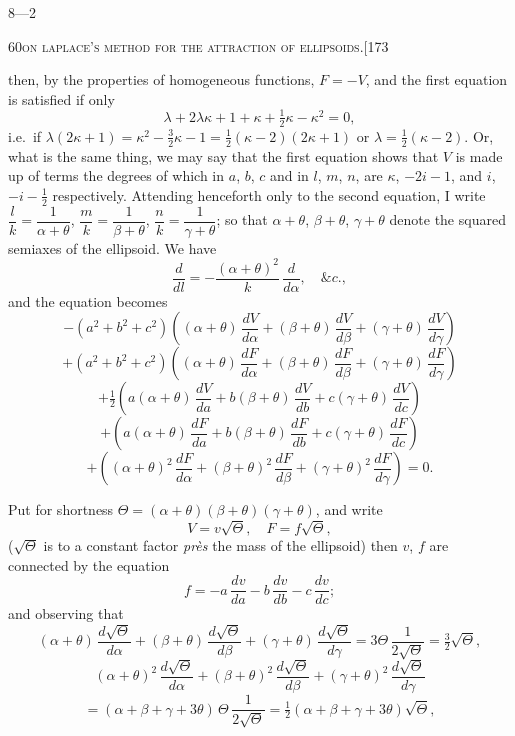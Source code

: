 \documentclass[11pt]{article}
\begin{document}
\medskip
\hfill 8---2

\newpage

\begin{center}
\small\textsc{60}\hfill\textsc{on laplace's method for the attraction of ellipsoids.}\hfill[173
\end{center}

\medskip

\noindent then, by the properties of homogeneous functions, $F = - V$, and the first equation is
satisfied if only
\[
\lambda + 2\lambda\kappa + 1 + \kappa + \tfrac{1}{2}\kappa - \kappa^{2} = 0,
\]
i.e.\ if $\lambda(2\kappa+1) = \kappa^{2} - \tfrac{3}{2}\kappa - 1 = \tfrac{1}{2}(\kappa - 2)(2\kappa + 1)$ or $\lambda = \tfrac{1}{2}(\kappa - 2)$. Or, what is the same thing,
we may say that the first equation shows that $V$ is made up of terms the degrees
of which in $a$, $b$, $c$ and in $l$, $m$, $n$, are $\kappa$, $-2i-1$, and $i$, $-i-\tfrac{1}{2}$ respectively. Attending
henceforth only to the second equation, I write $\dfrac{l}{k} = \dfrac{1}{\alpha + \theta}$, $\dfrac{m}{k} = \dfrac{1}{\beta + \theta}$, $\dfrac{n}{k} = \dfrac{1}{\gamma + \theta}$; so
that $\alpha + \theta$, $\beta + \theta$, $\gamma + \theta$ denote the squared semiaxes of the ellipsoid. We have
\[
\frac{d}{dl} = -\frac{(\alpha + \theta)^{2}}{k}\,\frac{d}{d\alpha},\quad \&c.,
\]
and the equation becomes
\[
- (a^{2} + b^{2} + c^{2})\left((\alpha + \theta)\,\frac{dV}{d\alpha} + (\beta + \theta)\,\frac{dV}{d\beta} + (\gamma + \theta)\,\frac{dV}{d\gamma}\right)
\]
\[
+ (a^{2} + b^{2} + c^{2})\left((\alpha + \theta)\,\frac{dF}{d\alpha} + (\beta + \theta)\,\frac{dF}{d\beta} + (\gamma + \theta)\,\frac{dF}{d\gamma}\right)
\]
\[
+ \tfrac{1}{2}\left(a(\alpha + \theta)\,\frac{dV}{da} + b(\beta + \theta)\,\frac{dV}{db} + c(\gamma + \theta)\,\frac{dV}{dc}\right)
\]
\[
+ \left(a(\alpha + \theta)\,\frac{dF}{da} + b(\beta + \theta)\,\frac{dF}{db} + c(\gamma + \theta)\,\frac{dF}{dc}\right)
\]
\[
+ \left((\alpha + \theta)^{2}\,\frac{dF}{d\alpha} + (\beta + \theta)^{2}\,\frac{dF}{d\beta} + (\gamma + \theta)^{2}\,\frac{dF}{d\gamma}\right) = 0.
\]

Put for shortness $\Theta = (\alpha + \theta)(\beta + \theta)(\gamma + \theta)$, and write
\[
V = v\sqrt{\Theta},\quad F = f\sqrt{\Theta},
\]
($\sqrt{\Theta}$ is to a constant factor \emph{pr\`es} the mass of the ellipsoid) then $v$, $f$ are connected
by the equation
\[
f = - a\,\frac{dv}{da} - b\,\frac{dv}{db} - c\,\frac{dv}{dc};
\]
and observing that
\[
(\alpha + \theta)\,\frac{d\sqrt{\Theta}}{d\alpha} + (\beta + \theta)\,\frac{d\sqrt{\Theta}}{d\beta} + (\gamma + \theta)\,\frac{d\sqrt{\Theta}}{d\gamma} = 3\Theta\,\frac{1}{2\sqrt{\Theta}} = \tfrac{3}{2}\sqrt{\Theta},
\]
\[
(\alpha + \theta)^{2}\,\frac{d\sqrt{\Theta}}{d\alpha} + (\beta + \theta)^{2}\,\frac{d\sqrt{\Theta}}{d\beta} + (\gamma + \theta)^{2}\,\frac{d\sqrt{\Theta}}{d\gamma}
\]
\[
= (\alpha + \beta + \gamma + 3\theta)\,\Theta\,\frac{1}{2\sqrt{\Theta}} = \tfrac{1}{2}(\alpha + \beta + \gamma + 3\theta)\sqrt{\Theta},
\]
\end{document}
